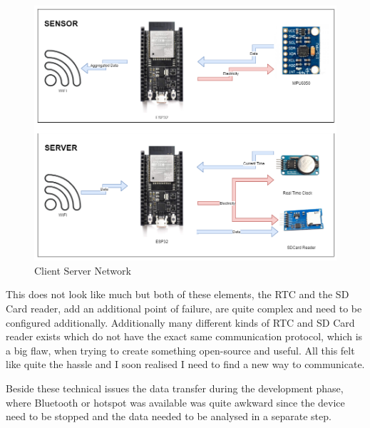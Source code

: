 \begin{figure}[ht]
  \begin{center}
\includegraphics[width=\linewidth]{images/CommunicationDiagrammExplenation.png}
  \end{center}
  \caption{Client Server Network}
  \label{fig:ClientServer}
\end{figure}

This does not look like much but both of these elements, the RTC and the SD Card reader, add an additional point of failure, are quite complex and need to be configured additionally. Additionally many different kinds of RTC and SD Card reader exists which do not have the exact same communication protocol, which is a big flaw, when trying to create something open-source and useful. All this felt like quite the hassle and I soon realised I need to find a new way to communicate.

Beside these technical issues the data transfer during the development phase, where Bluetooth or hotspot was available was quite awkward since the device need to be stopped and the data needed to be analysed in a separate step. 

